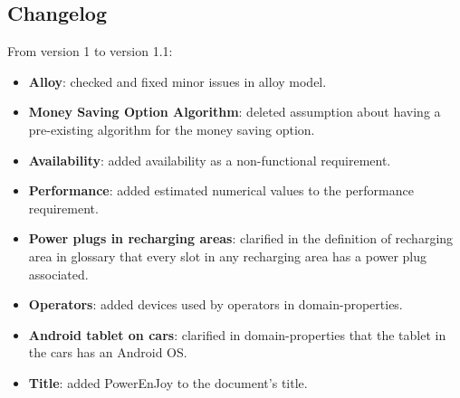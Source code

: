 \documentclass[12pt, a4paper]{article}
\begin{document}
		\subsection{Changelog}
From version 1 to version 1.1:
	\begin{itemize}
		\item \textbf{Alloy}: checked and fixed minor issues in alloy model.
		\item \textbf{Money Saving Option Algorithm}: deleted assumption about having a pre-existing algorithm for the money saving option.
		\item \textbf{Availability}: added availability as a non-functional requirement.
		\item \textbf{Performance}: added estimated numerical values to the performance requirement.
		\item \textbf{Power plugs in recharging areas}: clarified in the definition of recharging area in glossary that every slot in any recharging area has a power plug associated.
		\item \textbf{Operators}: added devices used by operators in domain-properties.
		\item \textbf{Android tablet on cars}: clarified in domain-properties that the tablet in the cars has an Android OS.
		\item \textbf{Title}: added PowerEnJoy to the document's title.
	\end{itemize}
\end{document}
